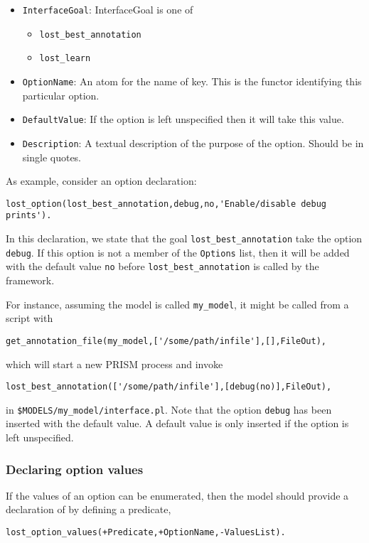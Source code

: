 \documentclass{book}
\begin{document}
\begin{itemize}
\item \texttt{InterfaceGoal}: InterfaceGoal is one of
	\begin{itemize}
	  \item \texttt{lost\_best\_annotation}
	  \item \texttt{lost\_learn}
	\end{itemize}
\item \texttt{OptionName}: An atom for the name of key. This is the
  functor identifying this particular option.
\item \texttt{DefaultValue}: If the option is left unspecified then
it will take this value.
\item \texttt{Description}: A textual description of the purpose of 
the option. Should be in single quotes. 
\end{itemize}

\noindent
As example, consider an option declaration:
\begin{verbatim}
lost_option(lost_best_annotation,debug,no,'Enable/disable debug prints').
\end{verbatim}

In this declaration, we state that the goal
\texttt{lost\_best\_annotation} take the option
\texttt{debug}. If this option is not a member of the
\texttt{Options} list, then it will be added with the default value \texttt{no} before 
\texttt{lost\_best\_annotation} is called by the framework. 

For instance, assuming the model is called \texttt{my\_model}, it
might be called from a script with
\begin{verbatim}
get_annotation_file(my_model,['/some/path/infile'],[],FileOut),
\end{verbatim}
which will start a new PRISM process and invoke 
\begin{verbatim}
lost_best_annotation(['/some/path/infile'],[debug(no)],FileOut),
\end{verbatim}
in \texttt{\$MODELS/my\_model/interface.pl}.
Note that the option \texttt{debug} has been inserted with the
default value. A default value is only inserted if the option is left
unspecified.

\subsubsection{Declaring option values}

If the values of an option can be enumerated, then the model should
provide a declaration of by defining a predicate, 
\begin{verbatim}
lost_option_values(+Predicate,+OptionName,-ValuesList).
\end{verbatim}
\end{document}
